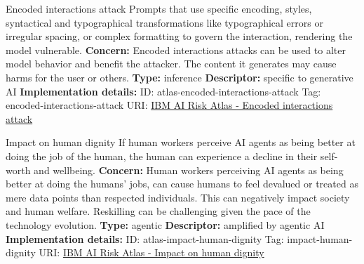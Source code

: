 \documentclass[a4paper,12pt]{article}
\begin{document}
\begin{definitionbox}{Encoded interactions attack}
Prompts that use specific encoding, styles, syntactical and typographical transformations like typographical errors or irregular spacing, or complex formatting to govern the interaction, rendering the model vulnerable.\newline\newline
\textbf{Concern: }Encoded interactions attacks can be used to alter model behavior and benefit the attacker. The content it generates may cause harms for the user or others.\newline\newline
\textbf{Type: }inference\newline
\textbf{Descriptor: }specific to generative AI \newline\newline
\textbf{Implementation details: } \newline
ID: atlas-encoded-interactions-attack \newline
Tag: encoded-interactions-attack \newline
URI:  \href{https://www.ibm.com/docs/en/watsonx/saas?topic=SSYOK8/wsj/ai-risk-atlas/encoded-interactions-attack.html}{IBM AI Risk Atlas - Encoded interactions attack}\newline
\end{definitionbox}
\begin{definitionbox}{Impact on human dignity}
If human workers perceive AI agents as being better at doing the job of the human, the human can experience a decline in their self-worth and wellbeing.\newline\newline
\textbf{Concern: }Human workers perceiving AI agents as being better at doing the humans' jobs, can cause humans to feel devalued or treated as mere data points than respected individuals. This can negatively impact society and human welfare. Reskilling can be challenging given the pace of the technology evolution.\newline\newline
\textbf{Type: }agentic\newline
\textbf{Descriptor: }amplified by agentic AI \newline\newline
\textbf{Implementation details: } \newline
ID: atlas-impact-human-dignity \newline
Tag: impact-human-dignity \newline
URI:  \href{https://www.ibm.com/docs/en/watsonx/saas?topic=SSYOK8/wsj/ai-risk-atlas/impact-human-dignity.html}{IBM AI Risk Atlas - Impact on human dignity}\newline
\end{definitionbox}
\end{document}
